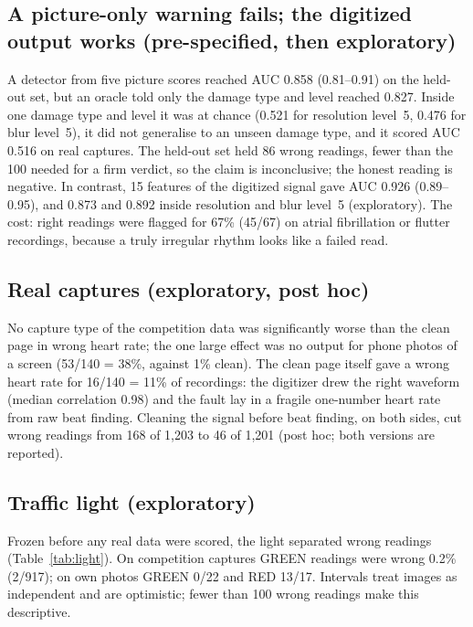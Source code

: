 \documentclass[conference]{IEEEtran}
\begin{document}
\subsection{A picture-only warning fails; the digitized output works (pre-specified, then exploratory)}
A detector from five picture scores reached AUC 0.858 (0.81--0.91) on the held-out set, but an oracle told only the damage type and level reached 0.827. Inside one damage type and level it was at chance (0.521 for resolution level~5, 0.476 for blur level~5), it did not generalise to an unseen damage type, and it scored AUC 0.516 on real captures. The held-out set held 86 wrong readings, fewer than the 100 needed for a firm verdict, so the claim is inconclusive; the honest reading is negative. In contrast, 15 features of the digitized signal gave AUC 0.926 (0.89--0.95), and 0.873 and 0.892 inside resolution and blur level~5 (exploratory). The cost: right readings were flagged for 67\% (45/67) on atrial fibrillation or flutter recordings, because a truly irregular rhythm looks like a failed read.

\subsection{Real captures (exploratory, post hoc)}
No capture type of the competition data was significantly worse than the clean page in wrong heart rate; the one large effect was no output for phone photos of a screen (53/140 = 38\%, against 1\% clean). The clean page itself gave a wrong heart rate for 16/140 = 11\% of recordings: the digitizer drew the right waveform (median correlation 0.98) and the fault lay in a fragile one-number heart rate from raw beat finding. Cleaning the signal before beat finding, on both sides, cut wrong readings from 168 of 1{,}203 to 46 of 1{,}201 (post hoc; both versions are reported).

\subsection{Traffic light (exploratory)}
Frozen before any real data were scored, the light separated wrong readings (Table~\ref{tab:light}). On competition captures GREEN readings were wrong 0.2\% (2/917); on own photos GREEN 0/22 and RED 13/17. Intervals treat images as independent and are optimistic; fewer than 100 wrong readings make this descriptive.
\end{document}
